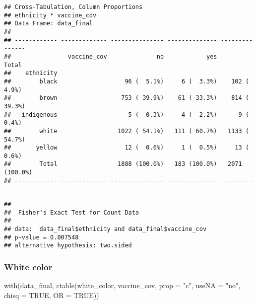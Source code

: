 \documentclass[
]{article}
\newenvironment{Shaded}{\begin{snugshade}}{\end{snugshade}}
\newcommand{\AttributeTok}[1]{\textcolor[rgb]{0.77,0.63,0.00}{#1}}
\newcommand{\ConstantTok}[1]{\textcolor[rgb]{0.00,0.00,0.00}{#1}}
\newcommand{\FunctionTok}[1]{\textcolor[rgb]{0.00,0.00,0.00}{#1}}
\newcommand{\NormalTok}[1]{#1}
\newcommand{\SpecialCharTok}[1]{\textcolor[rgb]{0.00,0.00,0.00}{#1}}
\newcommand{\StringTok}[1]{\textcolor[rgb]{0.31,0.60,0.02}{#1}}
\begin{document}
\begin{verbatim}
## Cross-Tabulation, Column Proportions  
## ethnicity * vaccine_cov  
## Data Frame: data_final  
## 
## ------------ ------------- --------------- -------------- ---------------
##                vaccine_cov              no            yes           Total
##    ethnicity                                                             
##        black                   96 (  5.1%)     6 (  3.3%)    102 (  4.9%)
##        brown                  753 ( 39.9%)    61 ( 33.3%)    814 ( 39.3%)
##   indigenous                    5 (  0.3%)     4 (  2.2%)      9 (  0.4%)
##        white                 1022 ( 54.1%)   111 ( 60.7%)   1133 ( 54.7%)
##       yellow                   12 (  0.6%)     1 (  0.5%)     13 (  0.6%)
##        Total                 1888 (100.0%)   183 (100.0%)   2071 (100.0%)
## ------------ ------------- --------------- -------------- ---------------
\end{verbatim}

\begin{Shaded}
\end{Shaded}

\begin{verbatim}
## 
##  Fisher's Exact Test for Count Data
## 
## data:  data_final$ethnicity and data_final$vaccine_cov
## p-value = 0.007548
## alternative hypothesis: two.sided
\end{verbatim}

\hypertarget{white-color}{%
\subsubsection{White color}\label{white-color}}

\begin{Shaded}
\begin{Highlighting}[]
\FunctionTok{with}\NormalTok{(data\_final, }\FunctionTok{ctable}\NormalTok{(white\_color, vaccine\_cov,  }\AttributeTok{prop =} \StringTok{"c"}\NormalTok{, }\AttributeTok{useNA =} \StringTok{"no"}\NormalTok{, }\AttributeTok{chisq =} \ConstantTok{TRUE}\NormalTok{, }\AttributeTok{OR =} \ConstantTok{TRUE}\NormalTok{))}
\end{Highlighting}
\end{Shaded}
\end{document}
